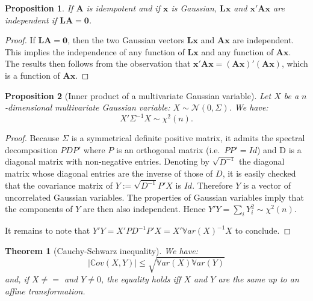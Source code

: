 \documentclass[
]{book}
\newtheorem{theorem}{Theorem}[chapter]
\newtheorem{proposition}{Proposition}[chapter]
\theoremstyle{definition}
\theoremstyle{definition}
\theoremstyle{definition}
\theoremstyle{definition}
\theoremstyle{remark}
\begin{document}
\begin{proposition}
\protect\hypertarget{prp:bandsindependent}{}\label{prp:bandsindependent}If \(\mathbf{A}\) is idempotent and if \(\mathbf{x}\) is Gaussian, \(\mathbf{L}\mathbf{x}\) and \(\mathbf{x}'\mathbf{A}\mathbf{x}\) are independent if \(\mathbf{L}\mathbf{A}=\mathbf{0}\).
\end{proposition}

\begin{proof}
If \(\mathbf{L}\mathbf{A}=\mathbf{0}\), then the two Gaussian vectors \(\mathbf{L}\mathbf{x}\) and \(\mathbf{A}\mathbf{x}\) are independent. This implies the independence of any function of \(\mathbf{L}\mathbf{x}\) and any function of \(\mathbf{A}\mathbf{x}\). The results then follows from the observation that \(\mathbf{x}'\mathbf{A}\mathbf{x}=(\mathbf{A}\mathbf{x})'(\mathbf{A}\mathbf{x})\), which is a function of \(\mathbf{A}\mathbf{x}\).
\end{proof}

\begin{proposition}[Inner product of a multivariate Gaussian variable]
\protect\hypertarget{prp:waldtypeproduct}{}\label{prp:waldtypeproduct}Let \(X\) be a \(n\)-dimensional multivariate Gaussian variable: \(X \sim \mathcal{N}(0,\Sigma)\). We have:
\[
X' \Sigma^{-1}X \sim \chi^2(n).
\]
\end{proposition}

\begin{proof}
Because \(\Sigma\) is a symmetrical definite positive matrix, it admits the spectral decomposition \(PDP'\) where \(P\) is an orthogonal matrix (i.e.~\(PP'=Id\)) and D is a diagonal matrix with non-negative entries. Denoting by \(\sqrt{D^{-1}}\) the diagonal matrix whose diagonal entries are the inverse of those of \(D\), it is easily checked that the covariance matrix of \(Y:=\sqrt{D^{-1}}P'X\) is \(Id\). Therefore \(Y\) is a vector of uncorrelated Gaussian variables. The properties of Gaussian variables imply that the components of \(Y\) are then also independent. Hence \(Y'Y=\sum_i Y_i^2 \sim \chi^2(n)\).

It remains to note that \(Y'Y=X'PD^{-1}P'X=X'\mathbb{V}ar(X)^{-1}X\) to conclude.
\end{proof}

\begin{theorem}[Cauchy-Schwarz inequality]
\protect\hypertarget{thm:CauchySchwarz}{}\label{thm:CauchySchwarz}We have:
\[
|\mathbb{C}ov(X,Y)| \le \sqrt{\mathbb{V}ar(X)\mathbb{V}ar(Y)}
\]
and, if \(X \ne =\) and \(Y \ne 0\), the equality holds iff \(X\) and \(Y\) are the same up to an affine transformation.
\end{theorem}
\end{document}
